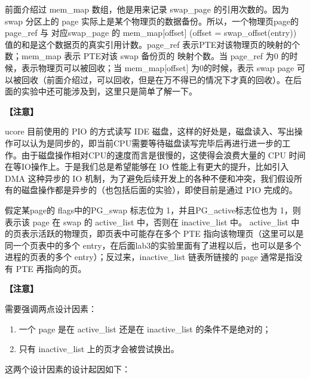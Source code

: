 前面介绍过 mem\_map 数组，他是用来记录 swap\_page 的引用次数的。因为
swap 分区上的 page 实际上是某个物理页的数据备份。所以，一个物理页page的
page\_ref 与 对应swap\_page 的 mem\_map{[}offset{]} (offset =
swap\_offset(entry)) 值的和是这个数据页的真实引用计数。page\_ref
表示PTE对该物理页的映射的个数；mem\_map 表示 PTE对该 swap 备份页的
映射个数。当 page\_ref 为0 的时候，表示物理页可以被回收；当
mem\_map{[}offset{]} 为0的时候，表示 swap page
可以被回收（前面介绍过，可以回收，但是在万不得已的情况下才真的回收）。在后面的实验中还可能涉及到，这里只是简单了解一下。

\textbf{【注意】}

ucore 目前使用的 PIO 的方式读写 IDE
磁盘，这样的好处是，磁盘读入、写出操作可以认为是同步的，即当前CPU需要等待磁盘读写完毕后再进行进一步的工作。由于磁盘操作相对CPU的速度而言是很慢的，这使得会浪费大量的
CPU 时间在等IO操作上。于是我们总是希望能够在 IO
性能上有更大的提升，比如引入 DMA 这种异步的 IO
机制，为了避免后续开发上的各种不便和冲突，我们假设所有的磁盘操作都是异步的（也包括后面的实验），即使目前是通过
PIO 完成的。

假定某page的 flags中的PG\_swap 标志位为 1，并且PG\_active标志位也为
1，则表示该 page 在 swap 的 active\_list 中，否则在 inactive\_list 中。
active\_list 中的页表示活跃的物理页，即页表中可能存在多个 PTE
指向该物理页（这里可以是同一个页表中的多个
entry，在后面lab3的实验里面有了进程以后，也可以是多个进程的页表的多个
entry）；反过来，inactive\_list 链表所链接的 page 通常是指没有 PTE
再指向的页。

\textbf{【注意】}

需要强调两点设计因素：

\begin{enumerate}
\def\labelenumi{\arabic{enumi}.}
\tightlist
\item
  一个 page 是在 active\_list 还是在 inactive\_list 的条件不是绝对的；
\item
  只有 inactive\_list 上的页才会被尝试换出。
\end{enumerate}

这两个设计因素的设计起因如下：

